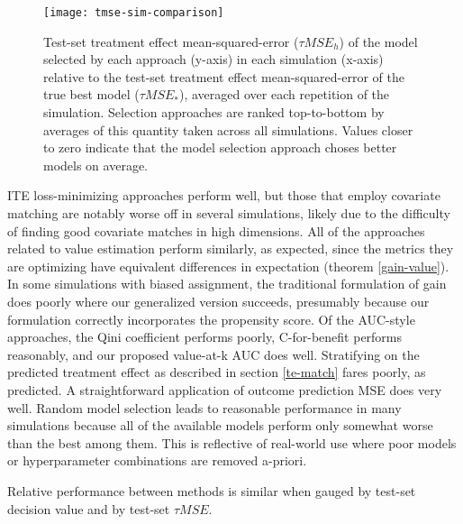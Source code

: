 \begin{figure}
\centering
\texttt{[image: tmse-sim-comparison]}
\caption{Test-set treatment effect mean-squared-error ($\tau MSE_h$) of the model selected by each approach (y-axis) in each simulation (x-axis) relative to the test-set  treatment effect mean-squared-error of the true best model ($\tau MSE_*$), averaged over each repetition of the simulation. Selection approaches are ranked top-to-bottom by averages of this quantity taken across all simulations. Values closer to zero indicate that the model selection approach choses better models on average.}
\end{figure}

ITE loss-minimizing approaches perform well, but those that employ covariate matching are notably worse off in several simulations, likely due to the difficulty of finding good covariate matches in high dimensions. All of the approaches related to value estimation perform similarly, as expected, since the metrics they are optimizing have equivalent differences in expectation (theorem \ref{gain-value}). In some simulations with biased assignment, the traditional formulation of gain does poorly where our generalized version succeeds, presumably because our formulation correctly incorporates the propensity score. Of the AUC-style approaches, the Qini coefficient performs poorly, C-for-benefit performs reasonably, and our proposed value-at-k AUC does well. Stratifying on the predicted treatment effect as described in section \ref{te-match} fares poorly, as predicted. A straightforward application of outcome prediction MSE does very well. Random model selection leads to reasonable performance in many simulations because all of the available models perform only somewhat worse than the best among them. This is reflective of real-world use where poor models or hyperparameter combinations are removed a-priori. 

Relative performance between methods is similar when gauged by test-set decision value and by test-set $\tau MSE$. 
